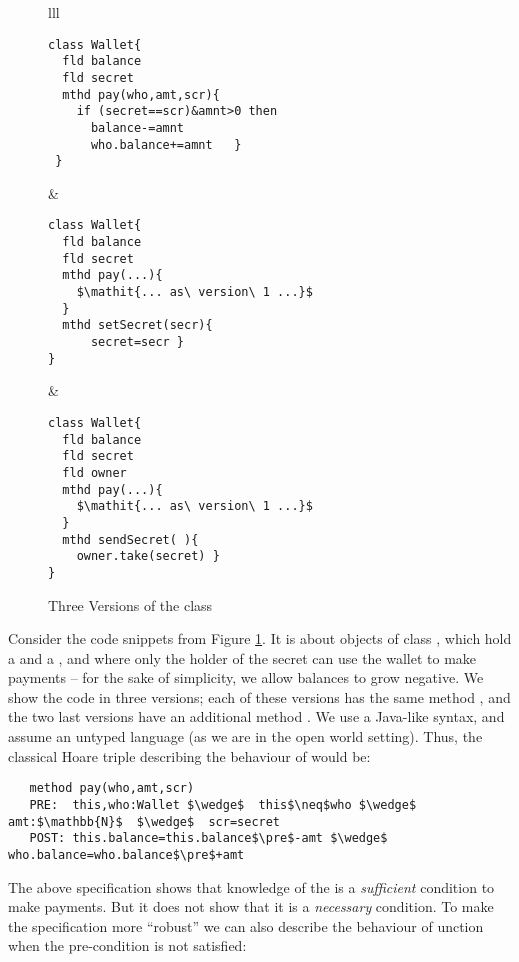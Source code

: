 \documentclass[acmsmall,screen]{acmart}
\begin{document}
 \begin{figure}[htb]
 \begin{tabular}{lll}
\begin{minipage}{0.39\textwidth}
\begin{lstlisting}
class Wallet{
  fld balance 
  fld secret 
  mthd pay(who,amt,scr){
    if (secret==scr)&amnt>0 then 
      balance-=amnt
      who.balance+=amnt   }
 }
\end{lstlisting}
\end{minipage}
  & 
\begin{minipage}{0.29\textwidth}
\begin{lstlisting}
class Wallet{
  fld balance  
  fld secret  
  mthd pay(...){
    $\mathit{... as\ version\ 1 ...}$
  }
  mthd setSecret(secr){
      secret=secr }
}
\end{lstlisting}
\end{minipage} &  
\begin{minipage}{0.32\textwidth}
\begin{lstlisting}
class Wallet{
  fld balance  
  fld secret  
  fld owner  
  mthd pay(...){
    $\mathit{... as\ version\ 1 ...}$
  }
  mthd sendSecret( ){
    owner.take(secret) }  
}
\end{lstlisting}
  \end{minipage}
 \end{tabular}
  \vspace*{-0.95cm}
  \caption{Three Versions of the class }
 \label{fig:Example}
 \end{figure}

Consider the code snippets from Figure \ref{fig:Example}. It is about objects of
 class , which hold a  and a , and where only the holder of the secret can use the wallet to
 make payments
 -- for the sake of simplicity, we allow   balances to grow negative.
 We show the code in three versions; each of these versions has the same method , and the two last versions
 have an additional method .
  We use a Java-like syntax, and assume an untyped language (as we are in the open world setting).
 Thus, the classical Hoare triple describing the behaviour of  would be:
 
\begin{lstlisting}
   method pay(who,amt,scr)
   PRE:  this,who:Wallet $\wedge$  this$\neq$who $\wedge$ amt:$\mathbb{N}$  $\wedge$  scr=secret   
   POST: this.balance=this.balance$\pre$-amt $\wedge$ who.balance=who.balance$\pre$+amt 
 \end{lstlisting}
\vspace{-.2in}
The above specification shows that knowledge of the  is a \emph{sufficient} condition to make payments. 
But it does not show that it is a \emph{necessary} condition. To make the specification  
  more ``robust'' we can also describe the behaviour of  unction  when the pre-condition is not satisfied:
\end{document}
